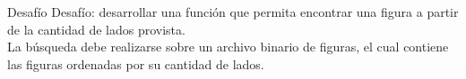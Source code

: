 \documentclass[12pt]{beamer}
\begin{document}
\begin{frame}{Desafío}
    \alert{Desafío:} desarrollar una función que permita encontrar una figura a partir de la cantidad de lados provista. \\ 
    \medskip
    La búsqueda debe realizarse sobre un archivo binario de figuras, el cual contiene las figuras ordenadas por su cantidad de lados. 
\end{frame}
\end{document}
